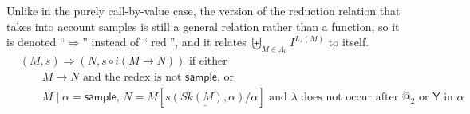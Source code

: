 \documentclass{article}
\newcommand{\tY}{\mathsf{Y}}
\newcommand{\tsample}{\mathsf{sample}}
\DeclareMathOperator{\red}{red}
\theoremstyle{definition}
\theoremstyle{lemma}
\theoremstyle{remark}
\begin{document}
Unlike in the purely call-by-value case, the version of the reduction relation that takes into account samples is still a general relation rather than a function, so it is denoted ``$\Rightarrow$'' instead of ``$\red$'', and it relates $\biguplus_{M \in \Lambda_0} I^{L_s(M)}$ to itself.
\begin{align*}
& (M,s) \Rightarrow (N,s \circ i(M \to N)) \text{ if either} \\
& \qquad \text{$M \to N$ and the redex is not $\tsample$, or} \\
& \qquad \text{$M \mid \alpha = \tsample$, $N = M[\underline{s(Sk(M),\alpha)}/\alpha]$ and $\lambda$ does not occur after $@_2$ or $\tY$ in $\alpha$}
\end{align*}
\end{document}
